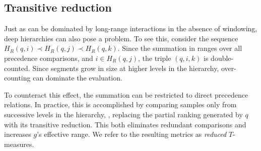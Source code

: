 \documentclass{article}
\begin{document}
\subsection{Transitive reduction}
\label{sec:transitive}

Just as  can be dominated by long-range interactions in the absence of windowing, deep hierarchies can also pose a problem.
To see this, consider the sequence $H_R(q, i) \prec H_R(q, j) \prec H_R(q, k)$.
Since the summation in  ranges over all precedence comparisons, and $i \in H_R(q, j)$, the
triple $(q, i, k)$ is double-counted.
Since segments grow in size at higher levels in the hierarchy, over-counting can dominate the evaluation.

To counteract this effect, the summation can be restricted to direct precedence relations.
In practice, this is accomplished by comparing samples only from successive levels in the hierarchy, \ie, 
replacing the partial ranking generated by $q$ with its transitive reduction.
This both eliminates redundant comparisons and increases $g$'s effective range.
We refer to the resulting metrics as \emph{reduced} $T$-measures.




\end{document}
